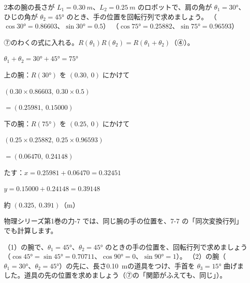 \begin{reidai}[ロボットの腕の手の位置]
2本の腕の長さが $L_1=\qty{0.30}{m}$、$L_2=\qty{0.25}{m}$ のロボットで、肩の角が $\theta_1=30°$、ひじの角が $\theta_2=45°$ のとき、手の位置を回転行列で求めましょう。\newline
（$\cos30°=0.86603$、$\sin30°=0.5$）\newline
（$\cos75°=0.25882$、$\sin75°=0.96593$）\par
\kangaekata ⑦のわくの式に入れる。$R(\theta_1)R(\theta_2)=R(\theta_1+\theta_2)$（④）。\par
\shiki $\theta_1+\theta_2=30°+45°=75°$\par
\kviigq 上の腕：$R(30°)$ を $(0.30,\ 0)$ にかけて\par
\kviigq \phantom{上の腕：}$(0.30\times0.86603,\ 0.30\times0.5)$\par
\kviigq \phantom{上の腕：}${}=(0.25981,\ 0.15000)$\par
\kviigq 下の腕：$R(75°)$ を $(0.25,\ 0)$ にかけて\par
\kviigq \phantom{下の腕：}$(0.25\times0.25882,\ 0.25\times0.96593)$\par
\kviigq \phantom{下の腕：}${}=(0.06470,\ 0.24148)$\par
\kviigq たす：$x=0.25981+0.06470=0.32451$\par
\kviigq \phantom{たす：}$y=0.15000+0.24148=0.39148$\par
\kotae 約 $(0.325,\ 0.391)$（m）
\end{reidai}
物理シリーズ第1巻の力-7 では、同じ腕の手の位置を、7-7 の「同次変換行列」でも計算します。

\begin{jibun}
（1）\nobreak {}の腕で、$\theta_1=45°$、$\theta_2=45°$ のときの手の位置を、回転行列で求めましょう（$\cos45°=\sin45°=0.70711$、$\cos90°=0$、$\sin90°=1$）。\newline
（2）\nobreak {}の腕（$\theta_1=30°$、$\theta_2=45°$）の先に、長さ\qty{0.10}{m}の道具をつけ、手首を $\theta_3=15°$ 曲げました。道具の先の位置を求めましょう（⑦の「関節がふえても、同じ」）。
\end{jibun}

